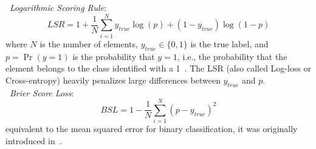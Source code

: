 \documentclass{aa}
\begin{document}


 \noindent \textbullet\ \emph{Logarithmic Scoring Rule}:
 \begin{equation}
 LSR = 1+\frac{1}{N} \sum_{i=1}^N y_{true} \log(p) + (1-y_{true}) \log(1-p)
 \end{equation}
 \noindent where $N$ is the number of elements, $y_{true}\in\{0,1\}$ is the
 true label, and $p{=}\operatorname{Pr}(y{=}1)$ is the probability that
 $y{=}1$, i.e., the probability that the element belongs to the class
 identified with a 1~\citep{Good_1952}. The LSR (also called Log-loss or
 Cross-entropy) heavily penalizes large differences between $y_{true}$ and
 $p$.\\

 \noindent \textbullet\ \emph{Brier Score Loss}:
 \begin{equation}
 BSL = 1-\frac{1}{N} \sum_{i=1}^N (p-y_{true})^2
 \end{equation}
 \noindent equivalent to the mean squared error for binary classification,
 it was originally introduced in~\cite{Brier_1950}.\\
\end{document}
